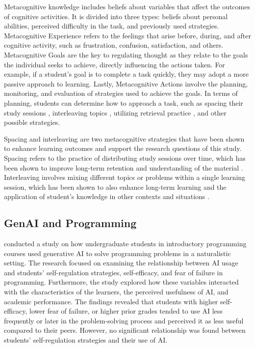 \documentclass[a4paper,twoside]{article}
\begin{document}
Metacognitive knowledge includes beliefs about variables that affect the
outcomes of cognitive activities. It is divided into three types: beliefs about
personal abilities, perceived difficulty in the task, and previously used
strategies. Metacognitive Experience refers to the feelings that arise before,
during, and after cognitive activity, such as frustration, confusion,
satisfaction, and others. Metacognitive Goals are the key to regulating thought
as they relate to the goals the individual seeks to achieve, directly
influencing the actions taken. For example, if a student’s goal is to complete
a task quickly, they may adopt a more passive approach to learning. Lastly,
Metacognitive Actions involve the planning, monitoring, and evaluation of
strategies used to achieve the goals. In terms of planning, students can
determine how to approach a task, such as spacing their study sessions
\citep{Ouhao18, Carvalho20}, interleaving topics \citep{Rivers21}, utilizing
retrieval practice \citep{larsen18}, and other possible strategies.

Spacing and interleaving are two metacognitive strategies that have been shown
to enhance learning outcomes and support the research questions of this study.
Spacing refers to the practice of distributing study sessions over time, which
has been shown to improve long-term retention and understanding of the material
\citep{Carvalho20}. Interleaving involves mixing different topics or problems
within a single learning session, which has been shown to also enhance long-term
learning and the application of student's knowledge in other contexts and
situations \citep{Rivers21}.

\subsection{GenAI and Programming}

\cite{Margulieux24} conducted a study on how undergraduate students in
introductory programming courses used generative AI to solve programming
problems in a naturalistic setting. The research focused on examining the
relationship between AI usage and students’ self-regulation strategies,
self-efficacy, and fear of failure in programming. Furthermore, the study
explored how these variables interacted with the characteristics of the learners,
the perceived usefulness of AI, and academic performance. The findings revealed
that students with higher self-efficacy, lower fear of failure, or higher prior
grades tended to use AI less frequently or later in the problem-solving process
and perceived it as less useful compared to their peers. However, no significant
relationship was found between students’ self-regulation strategies and their
use of AI.
\end{document}
